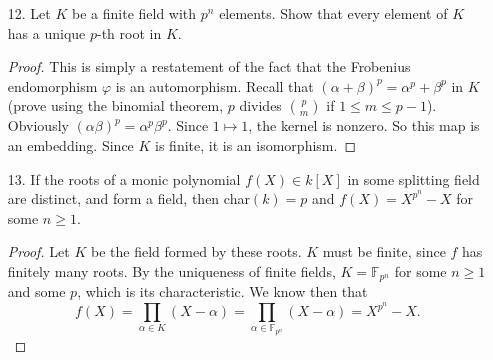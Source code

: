 \documentclass[10pt]{article}
\newcommand{\F}{\mathbb{F}}
\begin{document}
\begin{enumerate}
\item[12.] Let $K$ be a finite field with $p^n$ elements.  Show that every element of $K$ has a unique $p$-th root in $K$.

\begin{proof}
This is simply a restatement of the fact that the Frobenius endomorphism $\varphi$ is an automorphism.  Recall that $(\alpha + \beta)^p = \alpha^p + \beta^p$ in $K$ (prove using the binomial theorem, $p$ divides $\binom{p}{m}$ if $1 \leq m \leq p-1$).  Obviously $(\alpha\beta)^p = \alpha^p\beta^p$.  Since $1 \mapsto 1$, the kernel is nonzero.  So this map is an embedding.  Since $K$ is finite, it is an isomorphism.
\end{proof}

\item[13.] If the roots of a monic polynomial $f(X) \in k[X]$ in some splitting field are distinct, and form a field, then char$(k) = p$ and $f(X) = X^{p^n} - X$ for some $n \geq 1$.

\begin{proof}
Let $K$ be the field formed by these roots.  $K$ must be finite, since $f$ has finitely many roots.  By the uniqueness of finite fields, $K = \F_{p^n}$ for some $n \geq 1$ and some $p$, which is its characteristic.  We know then that
$$
f(X) = \prod_{\alpha \in K} (X-\alpha) = \prod_{\alpha \in \F_{p^n}} (X-\alpha) = X^{p^n} - X.
$$
\end{proof}

\end{enumerate}
\end{document}
